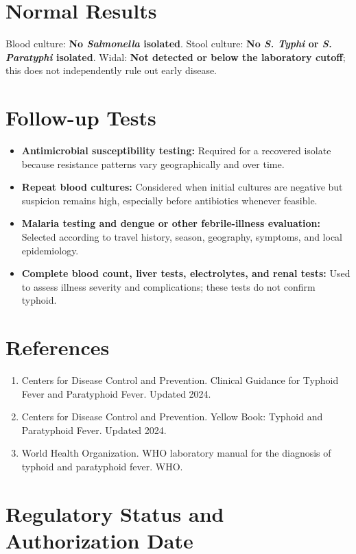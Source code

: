 \section*{Normal Results}
Blood culture: \textbf{No \textit{Salmonella} isolated}. Stool culture: \textbf{No \textit{S. Typhi} or \textit{S. Paratyphi} isolated}. Widal: \textbf{Not detected or below the laboratory cutoff}; this does not independently rule out early disease.

\section*{Follow-up Tests}
\begin{itemize}
  \item \textbf{Antimicrobial susceptibility testing:} Required for a recovered isolate because resistance patterns vary geographically and over time.
  \item \textbf{Repeat blood cultures:} Considered when initial cultures are negative but suspicion remains high, especially before antibiotics whenever feasible.
  \item \textbf{Malaria testing and dengue or other febrile-illness evaluation:} Selected according to travel history, season, geography, symptoms, and local epidemiology.
  \item \textbf{Complete blood count, liver tests, electrolytes, and renal tests:} Used to assess illness severity and complications; these tests do not confirm typhoid.
\end{itemize}

\section*{References}
\begin{enumerate}
  \item Centers for Disease Control and Prevention. Clinical Guidance for Typhoid Fever and Paratyphoid Fever. Updated 2024.
  \item Centers for Disease Control and Prevention. Yellow Book: Typhoid and Paratyphoid Fever. Updated 2024.
  \item World Health Organization. WHO laboratory manual for the diagnosis of typhoid and paratyphoid fever. WHO.
\end{enumerate}

\clearpage
\section*{Regulatory Status and Authorization Date}

\clearpage
